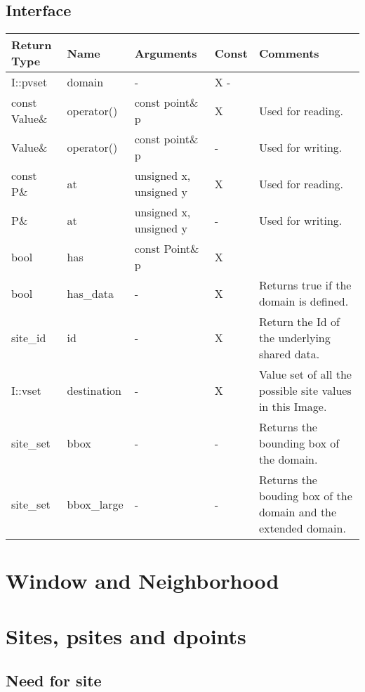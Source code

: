 \documentclass{report}
\begin{document}
\section{Interface}

\begin{tabular}{|l|l|l|l|p{4cm}|}
\hline
Return Type & Name & Arguments & Const & Comments \\ \hline

I::pvset & domain & - & X - &  \\ \hline
const Value\& & operator() & const point\& p & X & Used for reading. \\ \hline
Value\& & operator() & const point\& p & - & Used for writing. \\ \hline
const P\& & at & unsigned x,
         unsigned y & X & Used for reading. \\ \hline
P\& & at & unsigned x,
         unsigned y & - & Used for writing. \\ \hline
bool & has & const Point\& p & X & \\ \hline
bool & has\_data & - & X & Returns true if the domain is defined. \\ \hline
site\_id & id & - & X & Return the Id of the underlying shared data. \\ \hline
I::vset & destination & - & X & Value set of all the possible site values in this
Image. \\ \hline
site\_set & bbox & - & - & Returns the bounding box of the domain. \\ \hline
site\_set & bbox\_large & - & - & Returns the bouding box of the domain and the
extended domain. \\ \hline

\end{tabular}

\clearpage
\newpage
\chapter{Window and Neighborhood}




\clearpage
\newpage
\chapter{Sites, psites and dpoints}

\section{Need for site}
\end{document}
